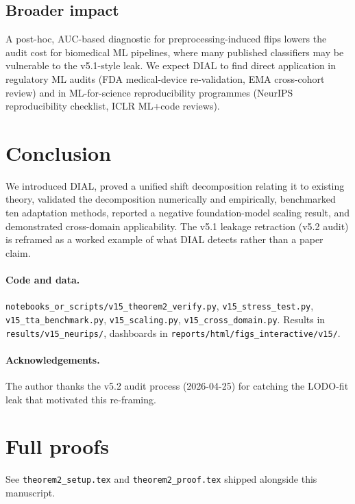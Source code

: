 \documentclass{article}
\begin{document}
\subsection{Broader impact}
A post-hoc, AUC-based diagnostic for preprocessing-induced flips lowers
the audit cost for biomedical ML pipelines, where many published
classifiers may be vulnerable to the v5.1-style leak. We expect DIAL
to find direct application in regulatory ML audits (FDA medical-device
re-validation, EMA cross-cohort review) and in ML-for-science
reproducibility programmes (NeurIPS reproducibility checklist, ICLR
ML+code reviews).

\section{Conclusion}

We introduced DIAL, proved a unified shift decomposition relating it to
existing theory, validated the decomposition numerically and
empirically, benchmarked ten adaptation methods, reported a negative
foundation-model scaling result, and demonstrated cross-domain
applicability. The v5.1 leakage retraction (v5.2 audit) is reframed as
a worked example of what DIAL detects rather than a paper claim.

\paragraph{Code and data.}
\texttt{notebooks\_or\_scripts/v15\_theorem2\_verify.py},
\texttt{v15\_stress\_test.py},
\texttt{v15\_tta\_benchmark.py},
\texttt{v15\_scaling.py},
\texttt{v15\_cross\_domain.py}.
Results in
\texttt{results/v15\_neurips/}, dashboards in
\texttt{reports/html/figs\_interactive/v15/}.

\paragraph{Acknowledgements.}
The author thanks the v5.2 audit process (2026-04-25) for catching the
LODO-fit leak that motivated this re-framing.

\appendix
\section{Full proofs}
See \texttt{theorem2\_setup.tex} and \texttt{theorem2\_proof.tex}
shipped alongside this manuscript.
\end{document}

